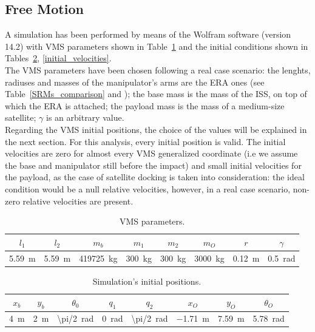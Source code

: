 \documentclass[a4paper,12pt,oneside]{report}
\begin{document}
\subsection{Free Motion}
A simulation has been performed by means of the Wolfram software (version 14.2) with VMS parameters shown in Table~\ref{VMS_parameters} and the initial conditions shown in Tables~\ref{initial_positions}, \ref{initial_velocities}.\\
The VMS parameters have been chosen following a real case scenario: the lenghts, radiuses and masses of the manipulator's arms are the ERA ones (see Table~\ref{SRMs_comparison} and \cite{four}); the base mass is the mass of the ISS, on top of which the ERA is attached; the payload mass is the mass of a medium-size satellite; $\gamma$ is an arbitrary value.\\
Regarding the VMS initial positions, the choice of the values will be explained in the next section. For this analysis, every initial position is valid. The initial velocities are zero for almost every VMS generalized coordinate (i.e we assume the base and manipulator still before the impact) and small initial velocities for the payload, as the case of satellite docking is taken into consideration: the ideal condition would be a null relative velocities, however, in a real case scenario, non-zero relative velocities are present.\\
\begin{table}
  \caption{VMS parameters.}
  \label{VMS_parameters}
  \begin{center}
  \begin{tabular}{cccccccc}
    \toprule
    $l_1$&$l_2$&$m_b$&$m_1$&$m_2$&$m_O$&$r$&$\gamma$\\
  \midrule
    \SI{5.59}{\metre}&\SI{5.59}{\metre}&\SI{419725}{\kilogram}&\SI{300}{\kilogram}&\SI{300}{\kilogram}&\SI{3000}{\kilogram}&\SI{0.12}{\metre}&\SI{0.5}{\radian}\\
  \bottomrule
  \end{tabular}
  \end{center}
\end{table}
\begin{table}
  \caption{Simulation's initial positions.}
  \label{initial_positions}
  \begin{center}
  \begin{tabular}{cccccccc}
    \toprule
    $x_b$&$y_b$&$\theta_0$&$q_1$&$q_2$&$x_O$&$y_O$&$\theta_O$\\
  \midrule
    \SI{4}{\metre}&\SI{2}{\metre}&\SI[parse-numbers = false]{\pi/2}{\radian}&\SI{0}{\radian}&\SI[parse-numbers = false]{\pi/2}{\radian}&\SI{-1.71}{\metre}&\SI{7.59}{\metre}&\SI{5.78}{\radian}\\
  \bottomrule
  \end{tabular}
  \end{center}
\end{table}
\end{document}
